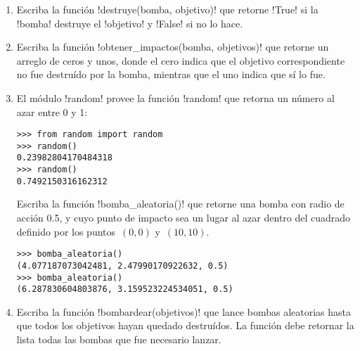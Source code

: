 \begin{enumerate}[leftmargin=0pt,label=\emph{\alph*})]

  \item
    Escriba la función \li!destruye(bomba, objetivo)!
    que retorne \li!True! si la \li!bomba! destruye el \li!objetivo!
    y \li!False! si no lo hace.
    

  \item
    Escriba la función \li!obtener_impactos(bomba, objetivos)!
    que retorne un arreglo de ceros y unos,
    donde el cero indica que el objetivo correspondiente
    no fue destruído por la bomba,
    mientras que el uno indica que sí lo fue.
    

  \item
    El módulo \li!random! provee la función \li!random!
    que retorna un número al azar entre 0 y 1:
\begin{lstlisting}
>>> from random import random
>>> random()
0.23982804170484318
>>> random()
0.7492150316162312
\end{lstlisting}
    Escriba la función \li!bomba_aleatoria()!
    que retorne una bomba con radio de acción 0.5,
    y cuyo punto de impacto sea un lugar al azar
    dentro del cuadrado definido por los puntos~\((0, 0)\) y~\((10, 10)\).
\begin{lstlisting}
>>> bomba_aleatoria()
(4.077187073042481, 2.47990170922632, 0.5)
>>> bomba_aleatoria()
(6.287830604803876, 3.159523224534051, 0.5)
\end{lstlisting}

  \item
    Escriba la función \li!bombardear(objetivos)!
    que lance bombas aleatorias hasta que todos los objetivos
    hayan quedado destruídos.
    La función debe retornar
    la lista todas las bombas que fue necesario lanzar.

\end{enumerate}

